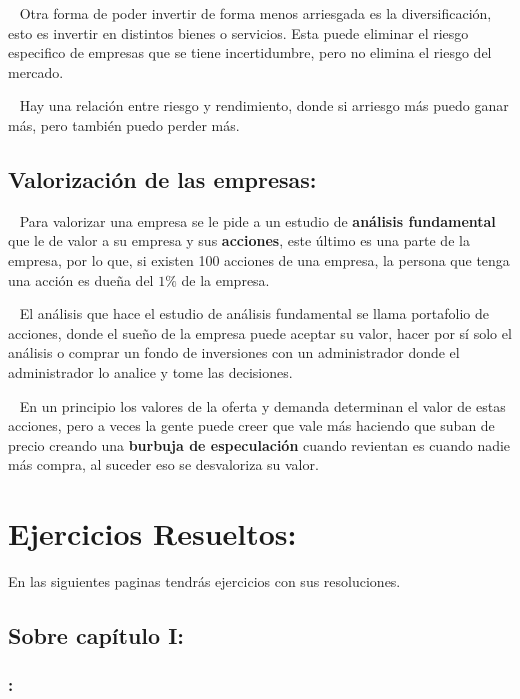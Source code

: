 \documentclass[
  letterpaper,
  DIV=11,
  numbers=noendperiod]{scrreport}
\begin{document}
~ Otra forma de poder invertir de forma menos arriesgada es la
diversificación, esto es invertir en distintos bienes o servicios. Esta
puede eliminar el riesgo especifico de empresas que se tiene
incertidumbre, pero no elimina el riesgo del mercado.

~ Hay una relación entre riesgo y rendimiento, donde si arriesgo más
puedo ganar más, pero también puedo perder más.

\hypertarget{valorizaciuxf3n-de-las-empresas}{%
\section{Valorización de las
empresas:}\label{valorizaciuxf3n-de-las-empresas}}

~ Para valorizar una empresa se le pide a un estudio de \textbf{análisis
fundamental} que le de valor a su empresa y sus \textbf{acciones}, este
último es una parte de la empresa, por lo que, si existen 100 acciones
de una empresa, la persona que tenga una acción es dueña del \(1\%\) de
la empresa.

~ El análisis que hace el estudio de análisis fundamental se llama
portafolio de acciones, donde el sueño de la empresa puede aceptar su
valor, hacer por sí solo el análisis o comprar un fondo de inversiones
con un administrador donde el administrador lo analice y tome las
decisiones.

~ En un principio los valores de la oferta y demanda determinan el valor
de estas acciones, pero a veces la gente puede creer que vale más
haciendo que suban de precio creando una \textbf{burbuja de
especulación} cuando revientan es cuando nadie más compra, al suceder
eso se desvaloriza su valor.


\hypertarget{ejercicios-resueltos}{%
\chapter{Ejercicios Resueltos:}\label{ejercicios-resueltos}}

En las siguientes paginas tendrás ejercicios con sus resoluciones.

\hypertarget{sobre-capuxedtulo-i}{%
\section{Sobre capítulo I:}\label{sobre-capuxedtulo-i}}

\hypertarget{section}{%
\subsection{:}\label{section}}
\end{document}

